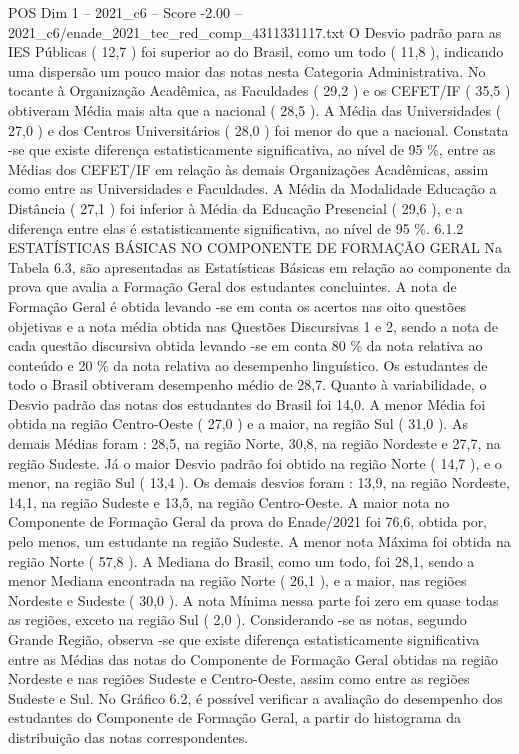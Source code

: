 \begin{textsample}{POS Dim 1 – 2021\_c6 – Score -2.00 – 2021\_c6/enade\_2021\_tec\_red\_comp\_4311331117.txt}
O Desvio padrão para as IES Públicas ( 12,7 ) foi superior ao do Brasil, como um todo ( 11,8 ), indicando uma dispersão um pouco maior das notas nesta Categoria Administrativa.
No tocante à Organização Acadêmica, as Faculdades ( 29,2 ) e os CEFET/IF ( 35,5 ) obtiveram Média mais alta que a nacional ( 28,5 ).
A Média das Universidades ( 27,0 ) e dos Centros Universitários ( 28,0 ) foi menor do que a nacional.
Constata -se que existe diferença estatisticamente significativa, ao nível de 95 \%, entre as Médias dos CEFET/IF em relação às demais Organizações Acadêmicas, assim como entre as Universidades e Faculdades.
A Média da Modalidade Educação a Distância ( 27,1 ) foi inferior à Média da Educação Presencial ( 29,6 ), e a diferença entre elas é estatisticamente significativa, ao nível de 95 \%. 6.1.2 ESTATÍSTICAS BÁSICAS NO COMPONENTE DE FORMAÇÃO GERAL Na Tabela 6.3, são apresentadas as Estatísticas Básicas em relação ao componente da prova que avalia a Formação Geral dos estudantes concluintes.
A nota de Formação Geral é obtida levando -se em conta os acertos nas oito questões objetivas e a nota média obtida nas Questões Discursivas 1 e 2, sendo a nota de cada questão discursiva obtida levando -se em conta 80 \% da nota relativa ao conteúdo e 20 \% da nota relativa ao desempenho linguístico.
Os estudantes de todo o Brasil obtiveram desempenho médio de 28,7.
Quanto à variabilidade, o Desvio padrão das notas dos estudantes do Brasil foi 14,0.
A menor Média foi obtida na região Centro-Oeste ( 27,0 ) e a maior, na região Sul ( 31,0 ).
As demais Médias foram : 28,5, na região Norte, 30,8, na região Nordeste e 27,7, na região Sudeste.
Já o maior Desvio padrão foi obtido na região Norte ( 14,7 ), e o menor, na região Sul ( 13,4 ).
Os demais desvios foram : 13,9, na região Nordeste, 14,1, na região Sudeste e 13,5, na região Centro-Oeste.
A maior nota no Componente de Formação Geral da prova do Enade/2021 foi 76,6, obtida por, pelo menos, um estudante na região Sudeste.
A menor nota Máxima foi obtida na região Norte ( 57,8 ).
A Mediana do Brasil, como um todo, foi 28,1, sendo a menor Mediana encontrada na região Norte ( 26,1 ), e a maior, nas regiões Nordeste e Sudeste ( 30,0 ).
A nota Mínima nessa parte foi zero em quase todas as regiões, exceto na região Sul ( 2,0 ).
Considerando -se as notas, segundo Grande Região, observa -se que existe diferença estatisticamente significativa entre as Médias das notas do Componente de Formação Geral obtidas na região Nordeste e nas regiões Sudeste e Centro-Oeste, assim como entre as regiões Sudeste e Sul.
No Gráfico 6.2, é possível verificar a avaliação do desempenho dos estudantes do Componente de Formação Geral, a partir do histograma da distribuição das notas correspondentes.

\end{textsample}
